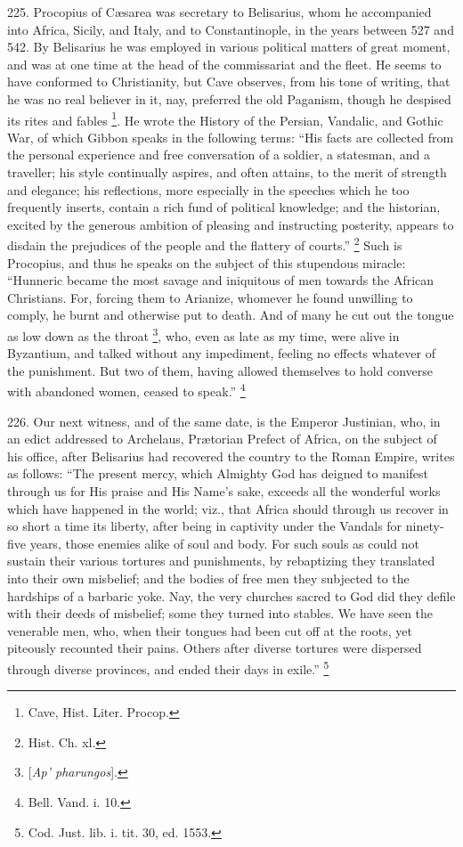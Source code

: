 225.
Procopius of Cæsarea was secretary to Belisarius, whom he accompanied
into Africa, Sicily, and Italy, and to Constantinople, in the years
between 527 and 542. By Belisarius he was employed in various
political matters of great moment, and was at one time at the head of
the commissariat and the fleet. He seems to have conformed to
Christianity, but Cave observes, from his tone of writing, that
he was no real believer in it, nay, preferred the old Paganism, though
he despised its rites and fables \footnote{Cave, Hist. Liter. Procop.}. He wrote the History of the Persian, Vandalic, and Gothic War,
of which Gibbon speaks in the following terms: ``His facts are
collected from the personal experience and free conversation of a
soldier, a statesman, and a traveller; his style continually aspires,
and often attains, to the merit of strength and elegance; his
reflections, more especially in the speeches which he too frequently
inserts, contain a rich fund of political knowledge; and the
historian, excited by the generous ambition of pleasing and
instructing posterity, appears to disdain the prejudices of the people
and the flattery of courts.'' \footnote{Hist. Ch. xl.}
Such is Procopius, and thus he speaks on the subject of this
stupendous miracle: ``Hunneric became the most savage and iniquitous of
men towards the African Christians. For, forcing them to Arianize,
whomever he found unwilling to comply, he burnt and otherwise put to
death. And of many he cut out the tongue as low down as the throat \footnote{[\emph{Ap' pharungos}].}, who, even as late as my time, were alive in Byzantium, and
talked without any impediment, feeling no effects whatever of the
punishment. But two of them, having allowed themselves to hold
converse with abandoned women, ceased to speak.'' \footnote{Bell. Vand. i. 10.}

226.
Our next witness, and of the same date, is the Emperor Justinian, who,
in an edict addressed to Archelaus, Prætorian Prefect of Africa, on
the subject of his office, after Belisarius had recovered the country
to the Roman Empire, writes as follows: ``The present mercy, which
Almighty God has deigned to manifest through us for His praise and His
Name's sake, exceeds all the wonderful works which have happened in
the world; viz., that Africa should through us recover in so short a
time its liberty, after being in captivity under the Vandals for
ninety-five years, those enemies alike of soul and body. For such
souls as could not sustain their various tortures and punishments, by
rebaptizing they translated into their own misbelief; and the bodies
of free men they subjected to the hardships of a barbaric yoke. Nay,
the very churches sacred to God did they defile with their deeds of
misbelief; some they turned into stables. We have seen the venerable
men, who, when their tongues had been cut off at the roots, yet
piteously recounted their pains. Others after diverse tortures were
dispersed through diverse provinces, and ended their days in exile.'' \footnote{Cod. Just. lib. i. tit. 30, ed. 1553.}

